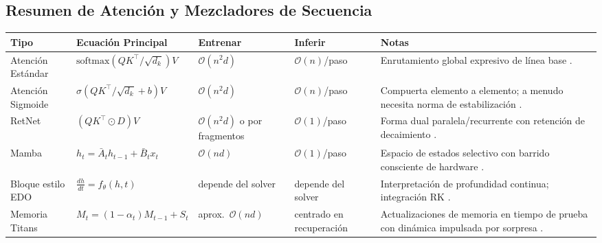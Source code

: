 \documentclass[11pt,a4paper]{article}
\begin{document}
\subsection{Resumen de Atención y Mezcladores de Secuencia}
\small
\begin{longtable}{p{2.4cm}p{3.2cm}p{2.0cm}p{2.0cm}p{4.8cm}}
\toprule
\textbf{Tipo} & \textbf{Ecuación Principal} & \textbf{Entrenar} & \textbf{Inferir} & \textbf{Notas} \\
\midrule
\endhead
Atención Estándar & $\text{softmax}(QK^\top/\sqrt{d_k})V$ & $\mathcal{O}(n^2d)$ & $\mathcal{O}(n)$/paso & Enrutamiento global expresivo de línea base \citep{vaswani_attention_2017}. \\
Atención Sigmoide & $\sigma(QK^\top/\sqrt{d_k}+b)V$ & $\mathcal{O}(n^2d)$ & $\mathcal{O}(n)$/paso & Compuerta elemento a elemento; a menudo necesita norma de estabilización \citep{ramapuram_theory_2024}. \\
RetNet & $(QK^\top\odot D)V$ & $\mathcal{O}(n^2d)$ o por fragmentos & $\mathcal{O}(1)$/paso & Forma dual paralela/recurrente con retención de decaimiento \citep{sun_retentive_2023}. \\
Mamba & $h_t=\bar{A}_t h_{t-1}+\bar{B}_t x_t$ & $\mathcal{O}(nd)$ & $\mathcal{O}(1)$/paso & Espacio de estados selectivo con barrido consciente de hardware \citep{gu_mamba_2023}. \\
Bloque estilo EDO & $\frac{dh}{dt}=f_\theta(h,t)$ & depende del solver & depende del solver & Interpretación de profundidad continua; integración RK \citep{zhang_continuous_2021}. \\
Memoria Titans & $M_t=(1-\alpha_t)M_{t-1}+S_t$ & aprox.\ $\mathcal{O}(nd)$ & centrado en recuperación & Actualizaciones de memoria en tiempo de prueba con dinámica impulsada por sorpresa \citep{behrouz_titans_2025}. \\
\bottomrule
\end{longtable}
\normalsize
\end{document}
